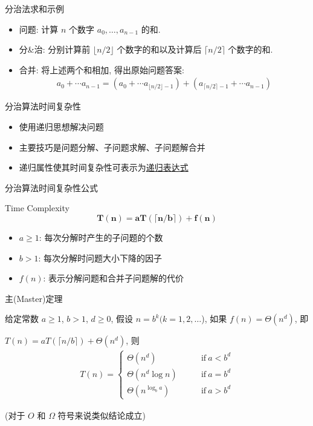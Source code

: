 \documentclass[fontset=fandol,UTF8,fleqn]{beamer}
\begin{document}
\begin{frame}{分治法求和示例}
\begin{itemize}[<+-|alert@+>]
\item 问题: 计算 $n$ 个数字 $a_0,\ldots,a_{n-1}$ 的和. 
\item 分\&治: 分别计算前 $\lfloor n/2 \rfloor$ 个数字的和以及计算后 $\lceil n/2 \rceil$ 个数字的和. 
\item 合并: 将上述两个和相加, 得出原始问题答案: 
  \begin{eqnarray*}
 a_0+\cdots a_{n-1} = (a_0+\cdots a_{\lfloor n/2 \rfloor -1})+(a_{\lceil n/2 \rceil-1}+\cdots  a_{n-1}) 
  \end{eqnarray*}
\end{itemize}
\end{frame}

\begin{frame}{分治算法时间复杂性}
\begin{itemize}[<+-|alert@+>]
\item 使用递归思想解决问题  
\item 主要技巧是问题分解、子问题求解、子问题解合并  
\item 递归属性使其时间复杂性可表示为\underline{递归表达式}  
\end{itemize}
\end{frame}

\begin{frame}{分治算法时间复杂性公式}
  \begin{exampleblock}{Time Complexity}
    \begin{displaymath}
\boldsymbol{T(n)= aT(\lceil n/b \rceil)+f(n)}
\end{displaymath}
\end{exampleblock}
\begin{itemize}[<+-|alert@+>]
\item $a\geq 1$: 每次分解时产生的子问题的个数 
\item $b>1$: 每次分解时问题大小下降的因子 
\item $f(n)$: 表示分解问题和合并子问题解的代价  
\end{itemize}
\end{frame}

\begin{frame}{主(Master)定理}
\begin{theorem}[主定理]给定常数 $a\geq 1$,  $b>1$,  $d\geq 0$,  假设 $n=b^k (k=1,2,\ldots$), 如果 $f(n) =
  \Theta(n^d)$, 即 

$T(n)=aT(\lceil n/b \rceil)+\Theta(n^d)$,  则
  \begin{eqnarray*}
    T(n) = \left\{
        \begin{array}{ll}
          \Theta(n^d) &\qquad  \mathrm{if}\ a < b^d   \\
\Theta(n^d\log n) &\qquad  \mathrm{if} \ a = b^d   \\
\Theta(n^{\log_ba}) &\qquad  \mathrm{if}\ a > b^d  
        \end{array}
\right. 
  \end{eqnarray*}
\end{theorem}
 (对于 $O$ 和 $\Omega$ 符号来说类似结论成立)   
\end{frame}
\end{document}

